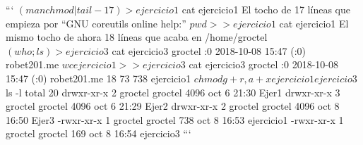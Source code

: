 ```
$ (man chmod | tail -17) > ejercicio1
$ cat ejercicio1
  El tocho de 17 líneas que empieza por “GNU coreutils online help:”
$ pwd >> ejercicio1
$ cat ejercicio1
  El mismo tocho de ahora 18 líneas que acaba en /home/groctel
$ (who ; ls) > ejercicio3
$ cat ejercicio3
  groctel  :0           2018-10-08 15:47 (:0)
  robet201.me
$ wc ejercicio1 >> ejercicio3
$ cat ejercicio3
  groctel  :0           2018-10-08 15:47 (:0)
  robet201.me
  18  73 738 ejercicio1
$ chmod g+r,a+x ejercicio1 ejercicio3
$ ls -l
  total 20
  drwxr-xr-x 2 groctel groctel 4096 oct  6 21:30 Ejer1
  drwxr-xr-x 3 groctel groctel 4096 oct  6 21:29 Ejer2
  drwxr-xr-x 2 groctel groctel 4096 oct  8 16:50 Ejer3
  -rwxr-xr-x 1 groctel groctel  738 oct  8 16:53 ejercicio1
  -rwxr-xr-x 1 groctel groctel  169 oct  8 16:54 ejercicio3
```
